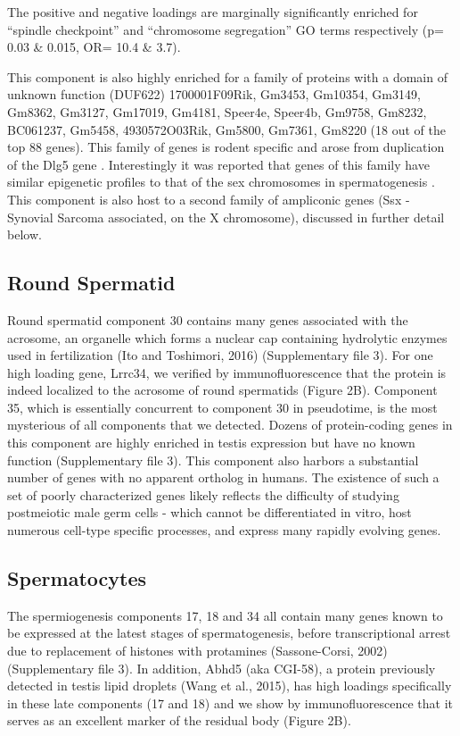 The positive and negative loadings are marginally significantly enriched for ``spindle checkpoint'' and ``chromosome segregation'' GO terms respectively (p= 0.03 \& 0.015, OR= 10.4 \& 3.7).

This component is also highly enriched for a family of proteins with a domain of unknown function (DUF622) 1700001F09Rik, Gm3453, Gm10354, Gm3149, Gm8362, Gm3127, Gm17019, Gm4181, Speer4e, Speer4b, Gm9758, Gm8232, BC061237, Gm5458, 4930572O03Rik, Gm5800, Gm7361, Gm8220 (18 out of the top 88 genes). This family of genes is rodent specific and arose from duplication of the Dlg5 gene \parencite{Church2009Lineagespecific}. Interestingly it was reported that genes of this family have similar epigenetic profiles to that of the sex chromosomes in spermatogenesis \parencite{Moretti2016Expression}. This component is also host to a second family of ampliconic genes (Ssx - Synovial Sarcoma associated, on the X chromosome), discussed in further detail below.

\subsection{Round Spermatid}
Round spermatid component 30 contains many genes associated with the acrosome, an organelle which forms a nuclear cap containing hydrolytic enzymes used in fertilization (Ito and Toshimori, 2016) (Supplementary file 3). For one high loading gene, Lrrc34, we verified by immunofluorescence that the protein is indeed localized to the acrosome of round spermatids (Figure 2B). Component 35, which is essentially concurrent to component 30 in pseudotime, is the most mysterious of all components that we detected. Dozens of protein-coding genes in this component are highly enriched in testis expression but have no known function (Supplementary file 3). This component also harbors a substantial number of genes with no apparent ortholog in humans. The existence of such a set of poorly characterized genes likely reflects the difficulty of studying postmeiotic male germ cells - which cannot be differentiated in vitro, host numerous cell-type specific processes, and express many rapidly evolving genes.

\subsection{Spermatocytes}

The spermiogenesis components 17, 18 and 34 all contain many genes known to be expressed at the latest stages of spermatogenesis, before transcriptional arrest due to replacement of histones with protamines (Sassone-Corsi, 2002) (Supplementary file 3). In addition, Abhd5 (aka CGI-58), a protein previously detected in testis lipid droplets (Wang et al., 2015), has high loadings specifically in these late components (17 and 18) and we show by immunofluorescence that it serves as an excellent marker of the residual body (Figure 2B).

